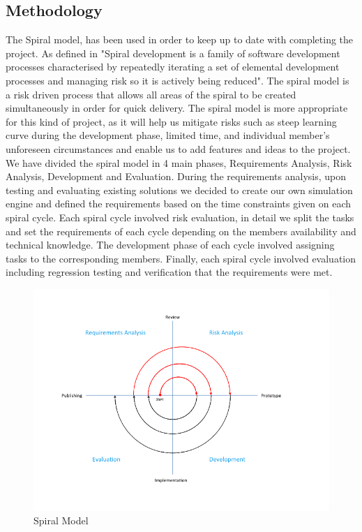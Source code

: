 \documentclass[oneside]{article}
\begin{document}
\subsection{Methodology}

\noindent The Spiral model, has been used in order to keep up to date with completing the project. As defined in \cite{boehm2000spiral} "Spiral development is a family of software development processes characterised by repeatedly iterating a set of elemental development processes and managing risk so it is actively being reduced". The spiral model is a risk driven process that allows all areas of the spiral to be created simultaneously in order for quick delivery. The spiral model is more appropriate for this kind of project, as it will help us mitigate risks such as steep learning curve during the development phase, limited time, and individual member's unforeseen circumstances and enable us to add features and ideas to the project. We have divided the spiral model in 4 main phases, Requirements Analysis, Risk Analysis, Development and Evaluation. During the requirements analysis, upon testing and evaluating existing solutions we decided to create our own simulation engine and defined the requirements based on the time constraints given on each spiral cycle. Each spiral cycle involved risk evaluation, in detail we split the tasks and set the requirements of each cycle depending on the members availability and technical knowledge. The development phase of each cycle involved assigning tasks to the corresponding members. Finally, each spiral cycle involved evaluation including regression testing and verification that the requirements were met. 

\begin{figure}[h] 
\centering \includegraphics[width=4.5in]{spiral} 
\caption{Spiral Model} 
\end{figure}
\newpage
\end{document}
